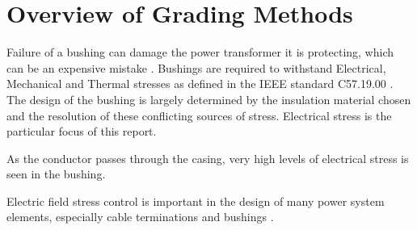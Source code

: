 \section{Overview of Grading Methods}
Failure of a bushing can damage the power transformer it is protecting, which can be an expensive mistake \cite{warne2005newnes}.
Bushings are required to withstand Electrical, Mechanical and Thermal stresses as defined in the IEEE standard C57.19.00 \cite{1440990}.
The design of the bushing is largely determined by the insulation material chosen and the resolution of these conflicting sources of stress.
Electrical stress is the particular focus of this report.

As the conductor passes through the casing, very high levels of electrical stress is seen in the bushing.

Electric field stress control is important in the design of many power system elements, especially cable terminations and bushings \cite{james2008condition}.


